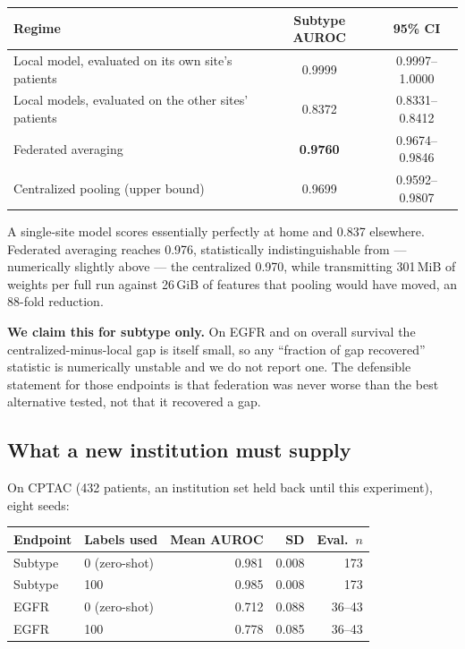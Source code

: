 \documentclass[11pt,a4paper]{article}
\begin{document}
\begin{center}
\begin{tabular}{@{}lcc@{}}
\toprule
\textbf{Regime} & \textbf{Subtype AUROC} & \textbf{95\% CI} \\
\midrule
Local model, evaluated on its own site's patients & 0.9999 & 0.9997--1.0000 \\
Local models, evaluated on the other sites' patients & 0.8372 & 0.8331--0.8412 \\
Federated averaging & \textbf{0.9760} & 0.9674--0.9846 \\
Centralized pooling (upper bound) & 0.9699 & 0.9592--0.9807 \\
\bottomrule
\end{tabular}
\end{center}

A single-site model scores essentially perfectly at home and 0.837 elsewhere. Federated
averaging reaches 0.976, statistically indistinguishable from --- numerically slightly above ---
the centralized 0.970, while transmitting 301\,MiB of weights per full run against
26\,GiB of features that pooling would have moved, an 88-fold reduction.

\textbf{We claim this for subtype only.} On EGFR and on overall survival the centralized-minus-local
gap is itself small, so any ``fraction of gap recovered'' statistic is numerically unstable and
we do not report one. The defensible statement for those endpoints is that federation was never
worse than the best alternative tested, not that it recovered a gap.

\subsection{What a new institution must supply}

On CPTAC (432 patients, an institution set held back until this experiment), eight seeds:

\begin{center}
\begin{tabular}{@{}llrrr@{}}
\toprule
\textbf{Endpoint} & \textbf{Labels used} & \textbf{Mean AUROC} & \textbf{SD} & \textbf{Eval.\ $n$} \\
\midrule
Subtype & 0 (zero-shot) & 0.981 & 0.008 & 173 \\
Subtype & 100 & 0.985 & 0.008 & 173 \\
\midrule
EGFR & 0 (zero-shot) & 0.712 & 0.088 & 36--43 \\
EGFR & 100 & 0.778 & 0.085 & 36--43 \\
\bottomrule
\end{tabular}
\end{center}
\end{document}
